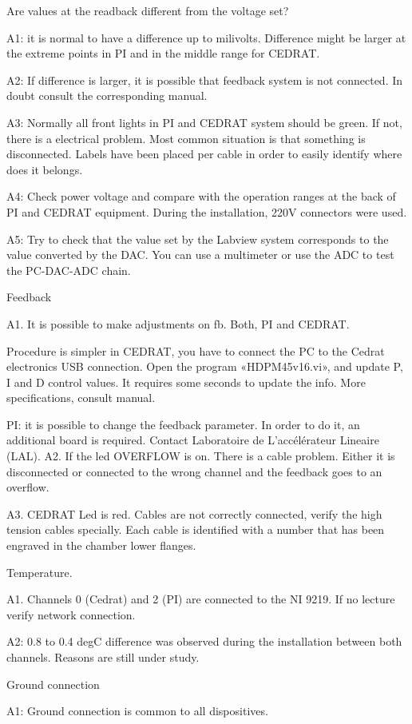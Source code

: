 Are values at the readback different from the voltage set?\par 
A1: it is normal to have a difference up to milivolts. Difference might be larger at the extreme points in PI and in the middle range for CEDRAT.\par 
A2: If difference is larger, it is possible that feedback system is not connected. In doubt  consult the corresponding manual.\par 
A3: Normally all front lights in PI and CEDRAT system should be green. If not, there is a electrical problem. Most common situation is that something is disconnected. Labels have been placed per cable in order to easily identify where does it belongs.\par 
A4: Check power voltage and compare with the operation ranges at the back of PI and CEDRAT equipment. During the installation, 220V connectors were used.\par 
A5: Try to check that the value set by the Labview system corresponds to the value converted by the DAC. You can use a multimeter or use the ADC to test the PC-DAC-ADC chain.\par 

Feedback\par 
A1. It is possible to make adjustments on fb. Both, PI and CEDRAT. \par 
Procedure is simpler in CEDRAT, you have to connect the PC to the Cedrat electronics USB connection. Open the program «HDPM45v16.vi», and update P, I and D control values. It requires some seconds to update the info. More specifications, consult manual.\par 
PI: it is possible to change the feedback parameter. In order to do it, an additional board is required. Contact Laboratoire de L'accélérateur Lineaire (LAL).
A2. If the led OVERFLOW is on. There is a cable problem. Either it is disconnected or connected to the wrong channel and the feedback goes to an overflow.\par 
A3. CEDRAT Led is red. Cables are not correctly connected, verify the high tension cables specially. Each cable is identified with a number that has been engraved in the chamber lower flanges.\par 

Temperature.\par 
A1. Channels 0 (Cedrat) and 2 (PI) are connected to the NI 9219. If no lecture verify network connection.\par 
A2: 0.8 to 0.4 degC difference was observed during the installation between both channels. Reasons are still under study.\par 

Ground connection\par 
A1: Ground connection is common to all dispositives. \par 





